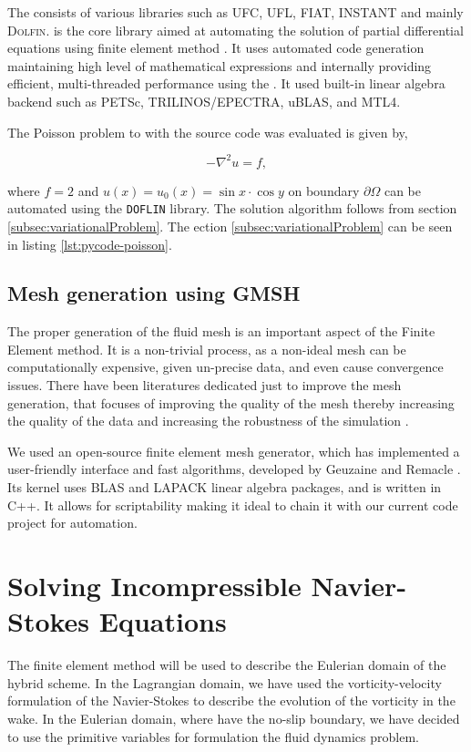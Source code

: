 The consists of various libraries such as UFC, UFL, FIAT, INSTANT and mainly \textsc{Dolfin}. \dolfin is the core library aimed at automating the solution of partial differential equations using finite element method \cite{Logg2011}. It uses automated code generation maintaining high level of mathematical expressions and internally providing efficient, multi-threaded performance using the . It used built-in linear algebra backend such as PETSc, TRILINOS/EPECTRA, uBLAS, and MTL4.

The Poisson problem to with the source code was evaluated is given by,

	\begin{equation}
	-\nabla^2 u = f,
	\end{equation}

where $f=2$ and $u(x) = u_0(x) = \sin x \cdot \cos y$ on boundary $\partial \Omega$ can be automated using the \texttt{DOFLIN} library. The solution algorithm follows from section \ref{subsec:variationalProblem}. The ection \ref{subsec:variationalProblem} can be seen in listing \ref{lst:pycode-poisson}.

\subsection{Mesh generation using GMSH}

The proper generation of the fluid mesh is an important aspect of the Finite Element method. It is a non-trivial process, as a non-ideal mesh can be computationally expensive, given un-precise data, and even cause convergence issues. There have been literatures dedicated just to improve the mesh generation, that focuses of improving the quality of the mesh thereby increasing the quality of the data and increasing the robustness of the simulation \cite{Hansen2005}. 

We used \gmsh an open-source finite element mesh generator, which has implemented a user-friendly interface and fast algorithms, developed by Geuzaine and Remacle \cite{Geuzaine2009a}. Its kernel uses \textsc{BLAS} and LAPACK linear algebra packages, and is written in C++. It allows for scriptability making it ideal to chain it with our current \python code project for automation.

\section{Solving Incompressible Navier-Stokes Equations}
The finite element method will be used to describe the Eulerian domain of the hybrid scheme. In the Lagrangian domain, we have used the vorticity-velocity formulation of the Navier-Stokes to describe the evolution of the vorticity in the wake. In the Eulerian domain, where have the no-slip boundary, we have decided to use the primitive variables for formulation the fluid dynamics problem. 

